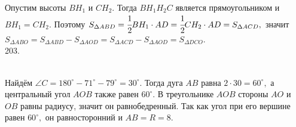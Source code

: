 \documentclass[12pt]{article}
\begin{document}
Опустим высоты $BH_1$ и $CH_2.$ Тогда $BH_1H_2C$ является прямоугольником и $BH_1=CH_2.$ Поэтому $S_{\Delta ABD}=\cfrac{1}{2}BH_1\cdot AD=\cfrac{1}{2}CH_2\cdot AD=S_{\Delta ACD},$ значит $S_{\Delta ABO}=S_{\Delta ABD}-S_{\Delta AOD}=S_{\Delta ACD}-S_{\Delta AOD}=S_{\Delta DCO}.$\\
203. \begin{figure}[ht!]
\end{figure}\\
Найдём $\angle C=180^\circ-71^\circ-79^\circ=30^\circ.$ Тогда дуга $AB$ равна $2\cdot30=60^\circ,$ а центральный угол $AOB$ также равен $60^\circ.$ В треугольнике $AOB$ стороны $AO$ и $OB$ равны радиусу, значит он равнобедренный. Так как угол при его вершине равен $60^\circ,$ он равносторонний и $AB=R=8.$\\
\end{document}
